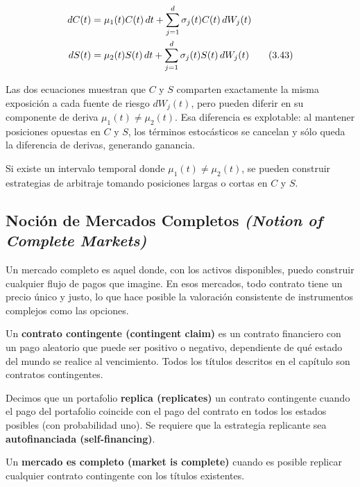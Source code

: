 \documentclass[12pt]{article}
\begin{document}
\begin{align}
  dC(t) &= \mu_1(t)C(t)\,dt + \sum_{j=1}^d \sigma_j(t)C(t)\,dW_j(t) \notag \\
  dS(t) &= \mu_2(t)S(t)\,dt + \sum_{j=1}^d \sigma_j(t)S(t)\,dW_j(t)
  \tag{3.43}
\end{align}

\begin{intuicionmat}
Las dos ecuaciones muestran que $C$ y $S$ comparten exactamente la misma exposici\'on a cada fuente de riesgo $dW_j(t)$, pero pueden diferir en su componente de deriva $\mu_1(t) \ne \mu_2(t)$. Esa diferencia es explotable: al mantener posiciones opuestas en $C$ y $S$, los t\'erminos estoc\'asticos se cancelan y s\'olo queda la diferencia de derivas, generando ganancia.
\end{intuicionmat}

Si existe un intervalo temporal donde $\mu_1(t) \ne \mu_2(t)$, se pueden construir estrategias de arbitraje tomando posiciones largas o cortas en $C$ y $S$.

\subsection{Noci\'on de Mercados Completos \textit{(Notion of Complete Markets)}}

\begin{intuicion}
Un mercado completo es aquel donde, con los activos disponibles, puedo construir cualquier flujo de pagos que imagine. En esos mercados, todo contrato tiene un precio \'unico y justo, lo que hace posible la valoraci\'on consistente de instrumentos complejos como las opciones.
\end{intuicion}

Un \textbf{contrato contingente (contingent claim)} es un contrato financiero con un pago aleatorio que puede ser positivo o negativo, dependiente de qu\'e estado del mundo se realice al vencimiento. Todos los t\'itulos descritos en el cap\'itulo son contratos contingentes.

Decimos que un portafolio \textbf{replica (replicates)} un contrato contingente cuando el pago del portafolio coincide con el pago del contrato en todos los estados posibles (con probabilidad uno). Se requiere que la estrategia replicante sea \textbf{autofinanciada (self-financing)}.

Un \textbf{mercado es completo (market is complete)} cuando es posible replicar cualquier contrato contingente con los t\'itulos existentes.
\end{document}
